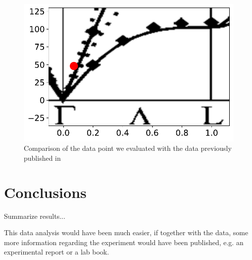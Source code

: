 \documentclass[aps,prx,reprint,amsmath,amssymb,superscriptaddress,showpacs]{revtex4-1}
\begin{document}
\begin{figure}
    \includegraphics[width=1.0\linewidth]{dispersion.pdf}
    \caption{Comparison of the data point we evaluated with the data previously published in \cite{Aouissi} }
    \label{fig2}
\end{figure}



\section{Conclusions}

Summarize results...

This data analysis would have been much easier, if together with the data, some more information regarding the experiment would have been published, e.g. an experimental report or a lab book.
\end{document}
